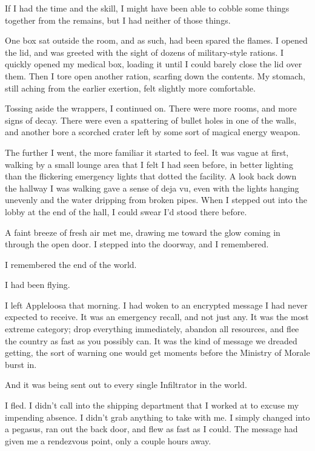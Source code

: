 If I had the time and the skill, I might have been able to cobble some things together from the remains, but I had neither of those things.

One box sat outside the room, and as such, had been spared the flames. I opened the lid, and was greeted with the sight of dozens of military-style rations. I quickly opened my medical box, loading it until I could barely close the lid over them. Then I tore open another ration, scarfing down the contents. My stomach, still aching from the earlier exertion, felt slightly more comfortable.

Tossing aside the wrappers, I continued on. There were more rooms, and more signs of decay. There were even a spattering of bullet holes in one of the walls, and another bore a scorched crater left by some sort of magical energy weapon.

The further I went, the more familiar it started to feel. It was vague at first, walking by a small lounge area that I felt I had seen before, in better lighting than the flickering emergency lights that dotted the facility. A look back down the hallway I was walking gave a sense of deja vu, even with the lights hanging unevenly and the water dripping from broken pipes. When I stepped out into the lobby at the end of the hall, I could swear I’d stood there before.

A faint breeze of fresh air met me, drawing me toward the glow coming in through the open door. I stepped into the doorway, and I remembered.

{\br}%
I remembered the end of the world.

I had been flying.

I left Appleloosa that morning. I had woken to an encrypted message I had never expected to receive. It was an emergency recall, and not just any. It was the most extreme category; drop everything immediately, abandon all resources, and flee the country as fast as you possibly can. It was the kind of message we dreaded getting, the sort of warning one would get moments before the Ministry of Morale burst in.

And it was being sent out to every single Infiltrator in the world.

I fled. I didn’t call into the shipping department that I worked at to excuse my impending absence. I didn’t grab anything to take with me. I simply changed into a pegasus, ran out the back door, and flew as fast as I could. The message had given me a rendezvous point, only a couple hours away.

